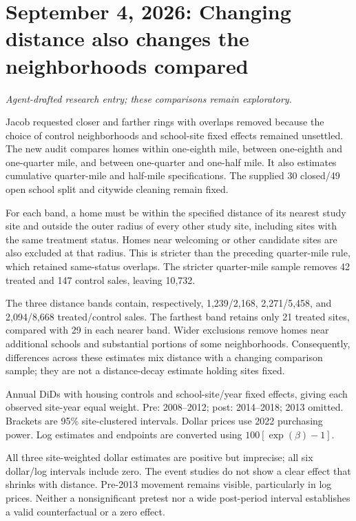 \section*{September 4, 2026: Changing distance also changes the neighborhoods compared}
\textit{Agent-drafted research entry; these comparisons remain exploratory.}

Jacob requested closer and farther rings with overlaps removed because the
choice of control neighborhoods and school-site fixed effects remained
unsettled. The new audit compares homes within one-eighth mile, between
one-eighth and one-quarter mile, and between one-quarter and one-half mile.
It also estimates cumulative quarter-mile and half-mile specifications.
The supplied 30 closed/49 open school split and citywide cleaning remain fixed.

For each band, a home must be within the specified distance of its nearest
study site and outside the outer radius of every other study site, including
sites with the same treatment status. Homes near welcoming or other candidate
sites are also excluded at that radius. This is stricter than the preceding
quarter-mile rule, which retained same-status overlaps. The stricter
quarter-mile sample removes 42 treated and 147 control sales, leaving 10,732.

The three distance bands contain, respectively, 1,239/2,168, 2,271/5,458, and
2,094/8,668 treated/control sales. The farthest band retains only 21 treated
sites, compared with 29 in each nearer band. Wider exclusions remove homes near
additional schools and substantial
portions of some neighborhoods. Consequently,
differences across these estimates mix distance with a changing comparison
sample; they are not a distance-decay estimate holding sites fixed.

\begin{center}
\scriptsize

\end{center}
{\footnotesize Annual DiDs with housing controls and school-site/year fixed
effects, giving each observed site-year equal weight. Pre: 2008--2012;
post: 2014--2018; 2013 omitted. Brackets are 95\% site-clustered intervals.
Dollar prices use 2022 purchasing power. Log estimates and endpoints are
converted using $100[\exp(\beta)-1]$.}

All three site-weighted dollar estimates are positive but imprecise; all
six dollar/log intervals include zero. The event studies do not show a
clear effect that shrinks with distance. Pre-2013 movement remains visible,
particularly in log prices. Neither a nonsignificant pretest nor a wide
post-period interval establishes a valid counterfactual or a zero effect.

